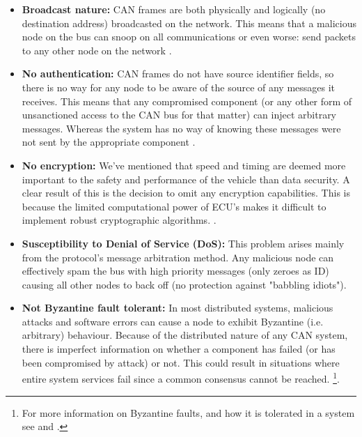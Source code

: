 \begin{itemize}
	\item \textbf{Broadcast nature:} CAN frames are both physically and logically (no destination address) broadcasted on the network. This means that a malicious node on the bus can snoop on all communications or even worse: send packets to any other node on the network \cite{Kosher}. 
	
	\item \textbf{No authentication:} CAN frames do not have source identifier fields, so there is no way for any node to be aware of the source of any messages it receives. This means that any compromised component (or any other form of unsanctioned access to the CAN bus for that matter) can inject arbitrary messages. Whereas the system has no way of knowing these messages were not sent by the appropriate component \cite{Kosher}\cite{CANissues}.
	
	\item \textbf{No encryption:} We've mentioned that speed and timing are deemed more important to the safety and performance of the vehicle than data security. A clear result of this is the decision to omit any encryption capabilities. This is because the limited  computational power of ECU's makes it difficult to implement robust cryptographic algorithms. \cite{CANissues}.  
	
	\item \textbf{Susceptibility to Denial of Service (DoS):} This problem arises mainly from the protocol's message arbitration method. Any malicious node can effectively spam the bus with high priority messages (only zeroes as ID) causing all other nodes to back off (no protection against "babbling idiots"\cite{Pike15})\cite{Kosher}.
	
	\item \textbf{Not Byzantine fault tolerant:} In most distributed systems, malicious attacks and software errors can cause a node to exhibit Byzantine (i.e. arbitrary) behaviour\cite{Byzantine}. Because of the distributed nature of any CAN system, there is imperfect information on whether a component has failed (or has been compromised by attack) or not. This could result in situations where entire system services fail since a common consensus cannot be reached\cite{wiki:ByzantineFault}. \footnote{For more information on Byzantine faults, and how it is tolerated in a system see \cite{Byzantine} and \cite{wiki:ByzantineFault}.}.
	
\end{itemize}

